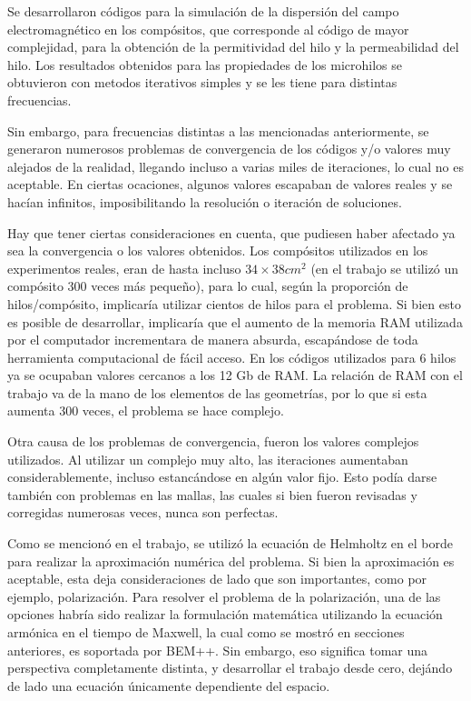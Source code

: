 \documentclass[12pt,letterpaper]{article}
\numberwithin{equation}{section}
\begin{document}
Se desarrollaron códigos para la simulación de la dispersión del campo electromagnético en los compósitos, que corresponde al código de mayor complejidad, para la obtención de la permitividad del hilo y la permeabilidad del hilo. Los resultados obtenidos para las propiedades de los microhilos se obtuvieron con metodos iterativos simples y se les tiene para distintas frecuencias.

Sin embargo, para frecuencias distintas a las mencionadas anteriormente, se generaron numerosos problemas de convergencia de los códigos y/o valores muy alejados de la realidad, llegando incluso a varias miles de iteraciones, lo cual no es aceptable. En ciertas ocaciones, algunos valores escapaban de valores reales y se hacían infinitos, imposibilitando la resolución o iteración de soluciones. 

Hay que tener ciertas consideraciones en cuenta, que pudiesen haber afectado ya sea la convergencia o los valores obtenidos. Los compósitos utilizados en los experimentos reales, eran de hasta incluso $34 \times 38 cm^2$ (en el trabajo se utilizó un compósito 300 veces más pequeño), para lo cual, según la proporción de hilos/compósito, implicaría utilizar cientos de hilos para el problema. Si bien esto es posible de desarrollar, implicaría que el aumento de la memoria RAM utilizada por el computador incrementara de manera absurda, escapándose de toda herramienta computacional de fácil acceso. En los códigos utilizados para 6 hilos ya se ocupaban valores cercanos a los 12 Gb de RAM. La relación de RAM con el trabajo va de la mano de los elementos de las geometrías, por lo que si esta aumenta 300 veces, el problema se hace complejo.

Otra causa de los problemas de convergencia, fueron los valores complejos utilizados. Al utilizar un complejo muy alto, las iteraciones aumentaban considerablemente, incluso estancándose en algún valor fijo. Esto podía darse también con problemas en las mallas, las cuales si bien fueron revisadas y corregidas numerosas veces, nunca son perfectas.

Como se mencionó en el trabajo, se utilizó la ecuación de Helmholtz en el borde para realizar la aproximación numérica del problema. Si bien la aproximación es aceptable, esta deja consideraciones de lado que son importantes, como por ejemplo, polarización. Para resolver el problema de la polarización, una de las opciones habría sido realizar la formulación matemática utilizando la ecuación armónica en el tiempo de Maxwell, la cual como se mostró en secciones anteriores, es soportada por BEM++. Sin embargo, eso significa tomar una perspectiva completamente distinta, y desarrollar el trabajo desde cero, dejándo de lado una ecuación únicamente dependiente del espacio.
\end{document}
